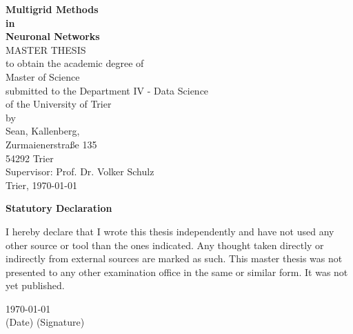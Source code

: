 \documentclass[a4paper,12pt,titlepage,enabledeprecatedfontcommands]{scrreprt}
\begin{document}
\begin{titlepage}
\phantom{erste Zeile}
\begin{center}
\Huge
\textbf{Multigrid Methods \\ in \\Neuronal Networks}\\
\vspace{0.5cm}
\large
\vspace{3cm}
MASTER THESIS \\
\vspace{0.5cm}
to obtain the academic degree of \\
Master of Science \\
\vspace{1cm}
submitted to the Department IV - Data Science\\
of the University of Trier \\
\vspace{2.5cm}
by \\
\vspace{1cm}
Sean, Kallenberg,\\
Zurmaienerstraße 135 \\
54292 Trier \\
\vspace{1cm}
Supervisor: Prof. Dr. Volker Schulz \\
\vspace{1cm}
Trier, \today         
\end{center}
\normalsize
\vfill
\end{titlepage}

\large
\vspace{2.5cm}
\begin{center}
\textbf{Statutory Declaration}\\
\end{center}
\vspace{0.5cm}
\normalsize
I hereby declare that I wrote this thesis independently and have not used any other source or tool than the ones indicated. Any thought taken directly or indirectly from external sources are marked as such. This master thesis was not presented to any other examination office in the same or similar form. It was not yet published.

\vspace{9cm}

\today\\             

\smallskip
\small\hspace{0cm}(Date) \hspace{8cm} (Signature)
\normalsize
\newpage
\end{document}
